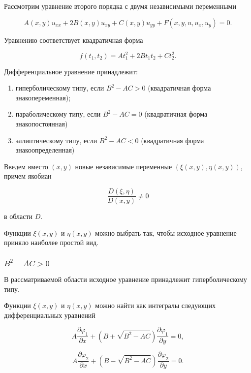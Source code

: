     Рассмотрим уравнение второго порядка с двумя независимыми переменными

    \[
        A \left( x, y \right) u_{xx} + 2 B \left( x, y \right) u_{xy} + C \left( x, y \right) u_{yy} + F \left( x, y, u, u_{x}, u_{y} \right) = 0.
    \]

    Уравнению соответствует квадратичная форма

    \[
        f \left( t_{1}, t_{2} \right) = A t^{2}_{1} + 2 B t_{1} t_{2} + C t^{2}_{2}.
    \]

    Дифференциальное уравнение принадлежит:
    
    \begin{enumerate}
        \item гиперболическому типу, если $B^{2} - AC > 0$ (квадратичная форма знакопеременная);
        \item параболическому типу, если $B^{2} - AC = 0$ (квадратичная форма знакопостоянная)
        \item эллиптическому типу, если $B^{2} - AC < 0$ (квадратичная форма знакоопределенная)
    \end{enumerate}

    Введем вместо $\left(x, y \right)$ новые независимые переменные $\left( \xi \left( x, y \right), \eta \left( x, y \right) \right)$, причем якобиан

    \[
        \frac{D \left( \xi, \eta \right)}{D \left( x, y \right)} \neq 0
    \]

    в области $D$.

    Функции $\xi \left( x, y \right)$ и $\eta \left( x, y \right)$ можно выбрать так, чтобы исходное уравнение приняло наиболее простой вид.

    \subsubsection{$B^{2} - AC > 0$}

        В рассматриваемой области исходное уравнение принадлежит гиперболическому типу.

        Функции $\xi \left( x, y \right)$ и $\eta \left( x, y \right)$ можно найти как интегралы следующих дифференциальных уравнений

        \[
            A \frac{\partial \varphi_{1}}{\partial x} + \left( B + \sqrt{B^{2} - A C} \right) \frac{\partial \varphi_{1}}{\partial y} = 0,
        \]

        \[
            A \frac{\partial \varphi_{2}}{\partial x} + \left( B - \sqrt{B^{2} - A C} \right) \frac{\partial \varphi_{2}}{\partial y} = 0.
        \]